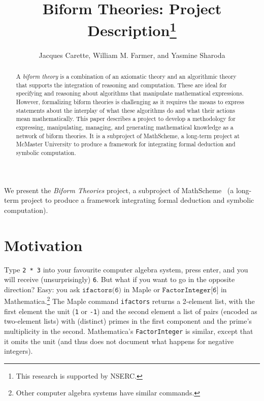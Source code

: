 \documentclass[fleqn]{llncs}
\title{Biform Theories: Project Description\thanks{This research is supported by NSERC.}}
\author{Jacques Carette, William M. Farmer, and Yasmine Sharoda}
\institute{%
Computing and Software, McMaster University, Canada\\
\url{http://www.cas.mcmaster.ca/~carette}\\
\url{http://imps.mcmaster.ca/wmfarmer}
}
\begin{document}
\maketitle

\begin{abstract}
A \emph{biform theory} is a combination of an axiomatic theory and an
algorithmic theory that supports the integration of reasoning and
computation.  These are ideal for specifying and reasoning about
algorithms that manipulate mathematical expressions.  However,
formalizing biform theories is challenging as it requires the means to
express statements about the interplay of what these algorithms do and
what their actions mean mathematically.  This paper describes a
project to develop a methodology for expressing, manipulating,
managing, and generating mathematical knowledge as a network of biform
theories.  It is a subproject of MathScheme, a long-term project at
McMaster University to produce a framework for integrating formal
deduction and symbolic computation.
\end{abstract}

\iffalse 

\textbf{Keywords:} Axiomatic mathematics, algorithmic mathematics, biform
theories, symbolic computation, reasoning about syntax, meaning
formulas, theory graphs.

\fi

\noindent
We present the \emph{Biform Theories} project, a
subproject of MathScheme~\cite{CaretteEtAl11} (a long-term project
to produce a framework integrating formal
deduction and symbolic computation).

\section{Motivation}\label{sec:problem}

Type \texttt{2 * 3} into your favourite computer algebra system, press
enter, and you will receive (unsurprisingly) \texttt{6}. But what if
you want to go in the opposite direction?  Easy: you ask
$\texttt{ifactors(6)}$ in Maple or $\texttt{FactorInteger[6]}$ in
Mathematica.\footnote{Other computer algebra systems have similar
  commands.}  The Maple command \texttt{ifactors} returns a 2-element
list, with the first element the unit (\texttt{1} or \texttt{-1}) and
the second element a list of pairs (encoded as two-element lists) with
(distinct) primes in the first component and the prime's multiplicity
in the second. Mathematica's \texttt{FactorInteger} is similar, except
that it omits the unit (and thus does not document what happens for
negative integers).
\end{document}
